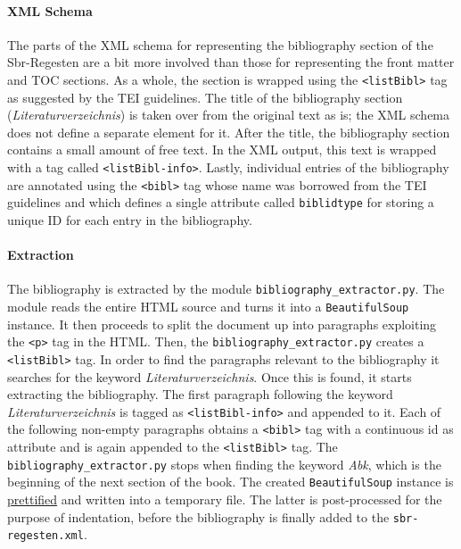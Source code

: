 \paragraph{XML Schema}

The parts of the XML schema for representing the bibliography section
of the Sbr-Regesten are a bit more involved than those for
representing the front matter and TOC sections. As a whole, the
section is wrapped using the \texttt{<listBibl>} tag as suggested by
the TEI guidelines. The title of the bibliography section
(\emph{Literaturverzeichnis}) is taken over from the original text as
is; the XML schema does not define a separate element for it. After
the title, the bibliography section contains a small amount of free
text. In the XML output, this text is wrapped with a tag called
\texttt{<listBibl-info>}. Lastly, individual entries of the
bibliography are annotated using the \texttt{<bibl>} tag whose name
was borrowed from the TEI guidelines and which defines a single
attribute called \texttt{biblidtype} for storing a unique ID for each
entry in the bibliography.

\paragraph{Extraction}

The bibliography is extracted by the module
\texttt{bibliography\_extractor.py}. The module reads the entire HTML
source and turns it into a \texttt{BeautifulSoup} instance. It then
proceeds to split the document up into paragraphs exploiting the
\texttt{<p>} tag in the HTML. Then, the
\texttt{bibliography\_extractor.py} creates a \texttt{<listBibl>} tag.
In order to find the paragraphs relevant to the bibliography it
searches for the keyword \emph{Literaturverzeichnis}. Once this is
found, it starts extracting the bibliography. The first paragraph
following the keyword \emph{Literaturverzeichnis} is tagged as
\texttt{<listBibl-info>} and appended to it. Each of the following
non-empty paragraphs obtains a \texttt{<bibl>} tag with a continuous
id as attribute and is again appended to the \texttt{<listBibl>} tag.
The \texttt{bibliography\_extractor.py} stops when finding the keyword
\emph{Abk}, which is the beginning of the next section of the book.
The created \texttt{BeautifulSoup} instance is
\href{http://www.crummy.com/software/BeautifulSoup/bs4/doc/#pretty-printing}{prettified}
and written into a temporary file. The latter is post-processed for
the purpose of indentation, before the bibliography is finally added
to the \texttt{sbr-regesten.xml}.

